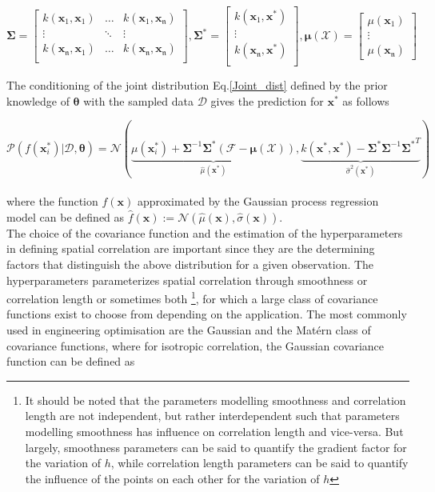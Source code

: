   \begin{equation}
{\bm{\Sigma}} =  \begin{bmatrix} 
k(\bm{x}_1,\bm{x}_1) &\hdots & k(\bm{x}_1,\bm{x}_\mathfrak{n})\\ 
\vdots & \ddots & \vdots\\ 
k(\bm{x}_\mathfrak{n},\bm{x}_1)  &\hdots & k(\bm{x}_\mathfrak{n},\bm{x}_\mathfrak{n})\\
\end{bmatrix},
{\bm{\Sigma}}^* =  \begin{bmatrix} 
k(\bm{x}_1,\bm{x}^*)\\ 
\vdots\\ 
k(\bm{x}_\mathfrak{n},\bm{x}^*)\\
\end{bmatrix},
\bm\mu(\mathcal{X}) =   \begin{bmatrix}
  \mu(\bm{x}_1) \\\vdots\\\mu(\bm{x}_\mathfrak{n}) 
  \end{bmatrix}
\end{equation}

The conditioning of the joint distribution Eq.\eqref{Joint_dist} defined by the prior knowledge of $\bm\theta$ with the sampled data $\mathcal{D}$ gives the prediction for $\bm{x}^*$ as follows

\begin{equation}
\mathcal{P}(f(\bm{x}_i^*)|\mathcal{D},\bm\theta)=\mathcal{N}(\underbrace{\mu(\bm{x}_i^*)+\bm{\Sigma}^{-1}\bm{\Sigma}^*(\mathcal{F}-\bm\mu(\mathcal{X}))}_{\hat{\mu}(\bm{x}^*)},\underbrace{k(\bm{x}^*,\bm{x}^*)-\bm{\Sigma}^*\bm{\Sigma}^{-1}{\bm{\Sigma}^*}^{T}}_{\hat{\sigma}^2(\bm{x}^*)})
\end{equation}\\

where the function $f(\bm x)$ approximated by the Gaussian process regression model can be defined as $\hat{f}(\bm x):=\mathcal{N}(\hat{\mu}(\bm x),\hat{\sigma}(\bm x))$.\\

The choice of the covariance function and the estimation of the hyperparameters in defining spatial correlation are important since they are the determining factors that distinguish the above distribution for a given observation. The hyperparameters parameterizes spatial correlation through smoothness or correlation length or sometimes both \footnote{It should be noted that the parameters modelling smoothness and correlation length are not independent, but rather interdependent such that parameters modelling smoothness has influence on correlation length and vice-versa. But largely, smoothness parameters can be said to quantify the gradient factor for the variation of $h$, while correlation length parameters can be said to quantify the influence of the points on each other for the variation of $h$}, for which a large class of covariance functions exist to choose from depending on the application. The most commonly used in engineering optimisation are the Gaussian and the Matérn class of covariance functions, where for isotropic correlation, the Gaussian covariance function can be defined as 

